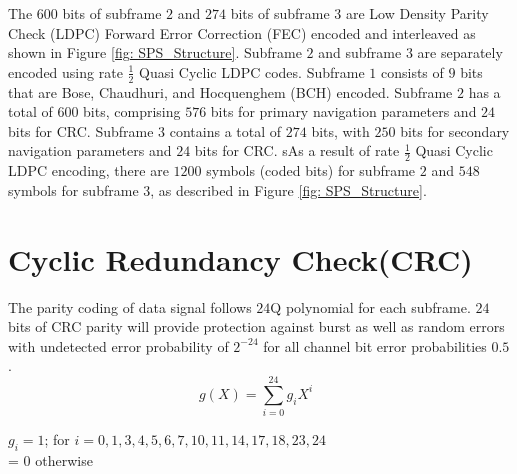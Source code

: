 \noindent The 600 bits of subframe $2$ and $274$ bits of subframe $3$ are Low Density Parity Check (LDPC) Forward Error Correction (FEC) encoded and interleaved as shown in Figure \ref{fig: SPS_Structure}. Subframe $2$ and subframe $3$ are separately encoded using rate $\frac{1}{2}$ Quasi Cyclic LDPC codes.
Subframe $1$ consists of $9$ bits that are Bose, Chaudhuri, and Hocquenghem (BCH) encoded.
Subframe $2$ has a total of $600$ bits, comprising $576$ bits for primary navigation parameters and $24$ bits for CRC.
Subframe $3$ contains a total of $274$ bits, with $250$ bits for secondary navigation parameters and $24$ bits for CRC.
sAs a result of rate $\frac{1}{2}$ Quasi Cyclic LDPC encoding, there are $1200$ symbols (coded bits) for subframe $2$ and $548$ symbols for subframe $3$, as described in Figure \ref{fig: SPS_Structure}.

\section{Cyclic Redundancy Check(CRC)}
The parity coding of data signal follows $24$Q polynomial for each subframe. $24$ bits of CRC parity will provide protection against burst as well as random errors with undetected error probability of $2^{-24}$ for all channel bit error probabilities $0.5$.
\begin{equation}
    g(X) = \sum_{i = 0}^{24}g_{i}X^i\;\; 
\end{equation}

    $g_{i}=1$; for $i = 0,1,3,4,5,6,7,10,11,14,17,18,23,24$ \\
          = 0 otherwise

\let\cleardoublepage\clearpage
